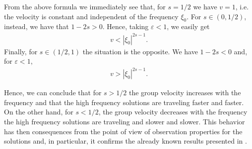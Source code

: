 \documentclass[10pt]{article}
\begin{document}
From the above formula we immediately see that, for $s=1/2$ we have $v=1$, i.e. the velocity is constant and independent of the frequency $\xi_0$. For $s\in(0,1/2)$, instead, we have that $1-2s>0$. Hence, taking $\varepsilon<1$, we easily get
\begin{align*}
	v<|\xi_0|^{2s-1}.
\end{align*}
Finally, for $s\in(1/2,1)$ the situation is the opposite. We have $1-2s<0$ and, for $\varepsilon<1$, 
\begin{align*}
	v>|\xi_0|^{2s-1}.
\end{align*}

Hence, we can conclude that for $s> 1/2$ the group velocity increases with the frequency and that the high frequency solutions are traveling faster and faster. On the other hand, for $s<1/2$, the group velocity decreases with the frequency the high frequency solutions are traveling and slower and slower. This behavior has then consequences from the point of view of observation properties for the solutions and, in particular, it confirms the already known results presented in \cite{biccari2014internal}.


\end{document}
